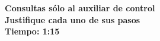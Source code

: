 \documentclass[letterpaper,11pt]{article}
\begin{document}
\vspace{15mm}
\begin{flushright}
	\textbf{Consultas sólo al auxiliar de control \\Justifique cada uno de sus pasos \\ Tiempo: 1:15}



\end{flushright}
\end{document}
